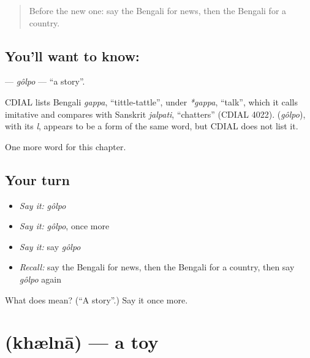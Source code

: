 \label{lesson:BN-C89-golpo}



\begin{quote}
Before the new one: say the Bengali for news, then the Bengali for a country.
\end{quote}

\subsection*{You'll want to know: }
\textbf{} — \emph{gôlpo} — \textquotedblleft{}a story\textquotedblright{}.

\begin{cousinweb}
CDIAL lists Bengali \emph{gappa}, \textquotedblleft{}tittle-tattle\textquotedblright{}, under \emph{*gappa}, \textquotedblleft{}talk\textquotedblright{}, which it calls imitative and compares with Sanskrit \emph{jalpati}, \textquotedblleft{}chatters\textquotedblright{} (CDIAL 4022). \textbf{} (\emph{gôlpo}), with its \emph{l}, appears to be a form of the same word, but CDIAL does not list it.
\end{cousinweb}

\begin{grammarlens}[title={What you've built}]
One more word for this chapter.
\end{grammarlens}

\subsection*{Your turn}
\begin{itemize}
\raggedright
  \item \emph{Say it:} \emph{gôlpo}
  \item \emph{Say it:} \emph{gôlpo}, once more
  \item \emph{Say it:} say \emph{gôlpo}
  \item \emph{Recall:} say the Bengali for news, then the Bengali for a country, then say \emph{gôlpo} again
\end{itemize}

\begin{tcolorbox}[breakable,colback=teal!4,colframe=teal!35!black,title={Before you move on}]
What does  mean? (\textquotedblleft{}A story\textquotedblright{}.) Say it once more.
\end{tcolorbox}
\section[\texorpdfstring{\bn{খেলনা} (khælnā)}{খেলনা (khælnā)}]{ (khælnā) — a toy}

